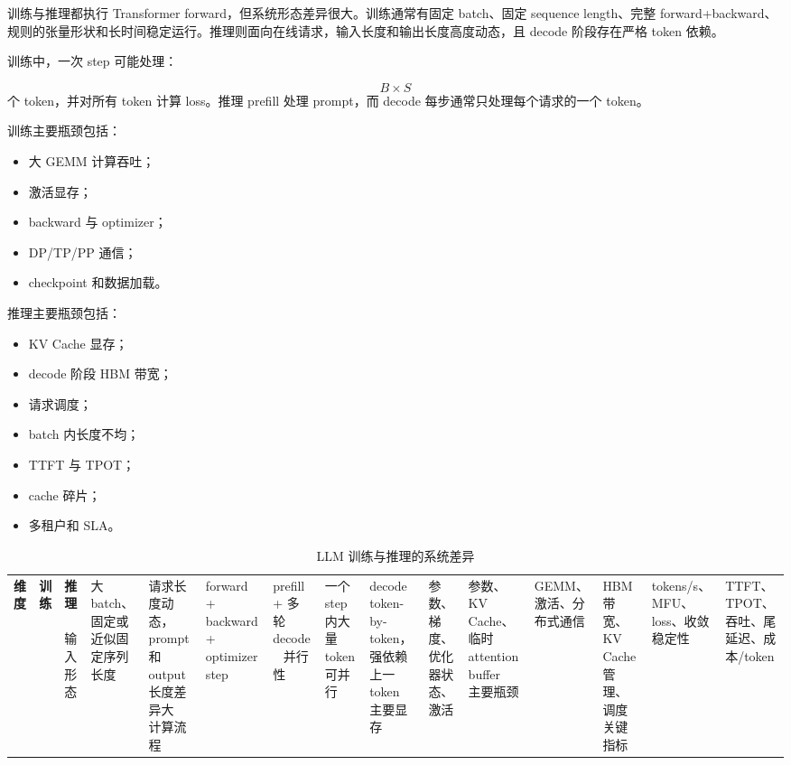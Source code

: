 训练与推理都执行 Transformer forward，但系统形态差异很大。训练通常有固定 batch、固定 sequence length、完整 forward+backward、规则的张量形状和长时间稳定运行。推理则面向在线请求，输入长度和输出长度高度动态，且 decode 阶段存在严格 token 依赖。

训练中，一次 step 可能处理：

\[
B\times S
\]
个 token，并对所有 token 计算 loss。推理 prefill 处理 prompt，而 decode 每步通常只处理每个请求的一个 token。

训练主要瓶颈包括：

\begin{itemize}
\item 大 GEMM 计算吞吐；
\item 激活显存；
\item backward 与 optimizer；
\item DP/TP/PP 通信；
\item checkpoint 和数据加载。
\end{itemize}

推理主要瓶颈包括：

\begin{itemize}
\item KV Cache 显存；
\item decode 阶段 HBM 带宽；
\item 请求调度；
\item batch 内长度不均；
\item TTFT 与 TPOT；
\item cache 碎片；
\item 多租户和 SLA。
\end{itemize}

\begin{table}[H]
\centering
\small
\caption{LLM 训练与推理的系统差异}
\label{tab:training-vs-inference}
\begin{tabular}{p{}p{}p{}}
\toprule
\textbf{维度} & \textbf{训练} & \textbf{推理} \
\midrule
输入形态
& 大 batch、固定或近似固定序列长度
& 请求长度动态，prompt 和 output 长度差异大 \
\midrule
计算流程
& forward + backward + optimizer step
& prefill + 多轮 decode \
\midrule
并行性
& 一个 step 内大量 token 可并行
& decode token-by-token，强依赖上一 token \
\midrule
主要显存
& 参数、梯度、优化器状态、激活
& 参数、KV Cache、临时 attention buffer \
\midrule
主要瓶颈
& GEMM、激活、分布式通信
& HBM 带宽、KV Cache 管理、调度 \
\midrule
关键指标
& tokens/s、MFU、loss、收敛稳定性
& TTFT、TPOT、吞吐、尾延迟、成本/token \
\bottomrule
\end{tabular}
\end{table}

